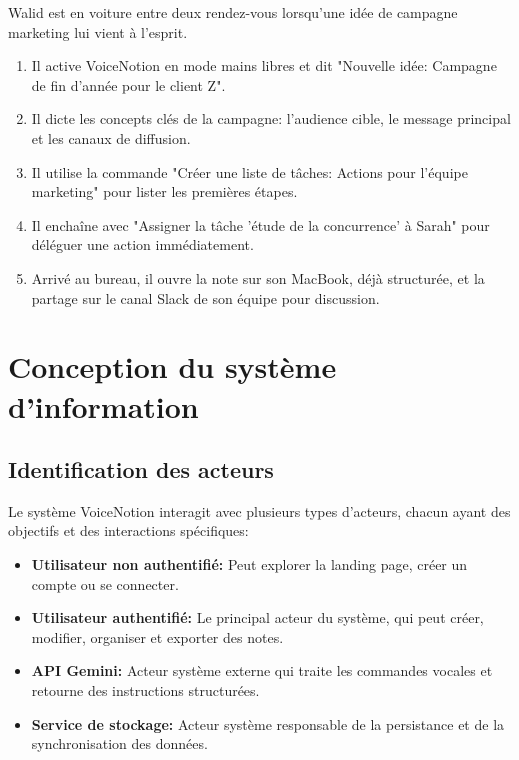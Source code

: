     Walid est en voiture entre deux rendez-vous lorsqu'une idée de campagne marketing lui vient à l'esprit.
    \begin{enumerate}
        \item Il active VoiceNotion en mode mains libres et dit "Nouvelle idée: Campagne de fin d'année pour le client Z".
        \item Il dicte les concepts clés de la campagne: l'audience cible, le message principal et les canaux de diffusion.
        \item Il utilise la commande "Créer une liste de tâches: Actions pour l'équipe marketing" pour lister les premières étapes.
        \item Il enchaîne avec "Assigner la tâche 'étude de la concurrence' à Sarah" pour déléguer une action immédiatement.
        \item Arrivé au bureau, il ouvre la note sur son MacBook, déjà structurée, et la partage sur le canal Slack de son équipe pour discussion.
    \end{enumerate}
    
    \section{Conception du système d'information}
    
    \subsection{Identification des acteurs}
    
    Le système VoiceNotion interagit avec plusieurs types d'acteurs, chacun ayant des objectifs et des interactions spécifiques:
    
    \begin{itemize}
        \item \textbf{Utilisateur non authentifié:} Peut explorer la landing page, créer un compte ou se connecter.
        
        \item \textbf{Utilisateur authentifié:} Le principal acteur du système, qui peut créer, modifier, organiser et exporter des notes.
        
        \item \textbf{API Gemini:} Acteur système externe qui traite les commandes vocales et retourne des instructions structurées.
        
        \item \textbf{Service de stockage:} Acteur système responsable de la persistance et de la synchronisation des données.
    \end{itemize}
    
